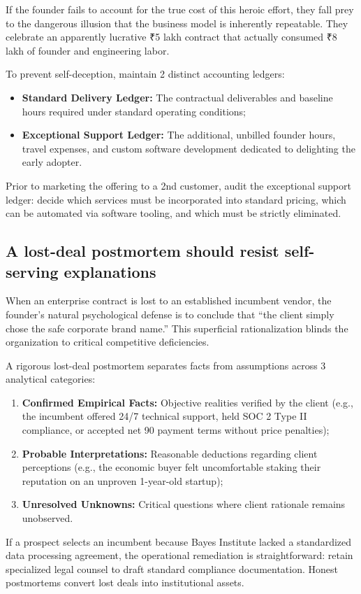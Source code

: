 If the founder fails to account for the true cost of this heroic effort, they fall prey to the dangerous illusion that the business model is inherently repeatable. They celebrate an apparently lucrative ₹5 lakh contract that actually consumed ₹8 lakh of founder and engineering labor.

To prevent self-deception, maintain 2 distinct accounting ledgers:
\begin{itemize}
\item \textbf{Standard Delivery Ledger:} The contractual deliverables and baseline hours required under standard operating conditions;
\item \textbf{Exceptional Support Ledger:} The additional, unbilled founder hours, travel expenses, and custom software development dedicated to delighting the early adopter.
\end{itemize}
Prior to marketing the offering to a 2nd customer, audit the exceptional support ledger: decide which services must be incorporated into standard pricing, which can be automated via software tooling, and which must be strictly eliminated.

\subsection{A lost-deal postmortem should resist self-serving explanations}

When an enterprise contract is lost to an established incumbent vendor, the founder's natural psychological defense is to conclude that ``the client simply chose the safe corporate brand name.'' This superficial rationalization blinds the organization to critical competitive deficiencies.

A rigorous lost-deal postmortem separates facts from assumptions across 3 analytical categories:
\begin{enumerate}
\item \textbf{Confirmed Empirical Facts:} Objective realities verified by the client (e.g., the incumbent offered 24/7 technical support, held SOC 2 Type II compliance, or accepted net 90 payment terms without price penalties);
\item \textbf{Probable Interpretations:} Reasonable deductions regarding client perceptions (e.g., the economic buyer felt uncomfortable staking their reputation on an unproven 1-year-old startup);
\item \textbf{Unresolved Unknowns:} Critical questions where client rationale remains unobserved.
\end{enumerate}
If a prospect selects an incumbent because Bayes Institute lacked a standardized data processing agreement, the operational remediation is straightforward: retain specialized legal counsel to draft standard compliance documentation. Honest postmortems convert lost deals into institutional assets.

